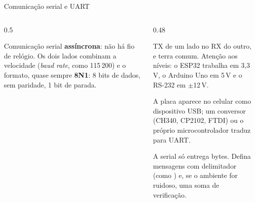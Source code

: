 \begin{frame}{Comunicação serial e UART}
  \begin{columns}[c]
    \begin{column}{0.5\textwidth}
      \centering
      \begin{definicao}[UART]
        Comunicação serial \textbf{assíncrona}: não há fio de relógio. Os dois lados combinam a velocidade (\emph{baud rate}, como 115\,200) e o formato, quase sempre \textbf{8N1}: 8 bits de dados, sem paridade, 1 bit de parada.
      \end{definicao}
    \end{column}
    \begin{column}{0.48\textwidth}
      \begin{conceito}[Ligação]
        TX de um lado no RX do outro, e terra comum. Atenção aos níveis: o ESP32 trabalha em 3,3\,V, o Arduino Uno em 5\,V e o RS-232 em $\pm$12\,V.
      \end{conceito}
      \begin{pordentro}
        A placa aparece no celular como dispositivo USB; um conversor (CH340, CP2102, FTDI) ou o próprio microcontrolador traduz para UART.
      \end{pordentro}
      \begin{dica}
        A serial só entrega bytes. Defina mensagens com delimitador (como ) e, se o ambiente for ruidoso, uma soma de verificação.
      \end{dica}
    \end{column}
  \end{columns}
\end{frame}

